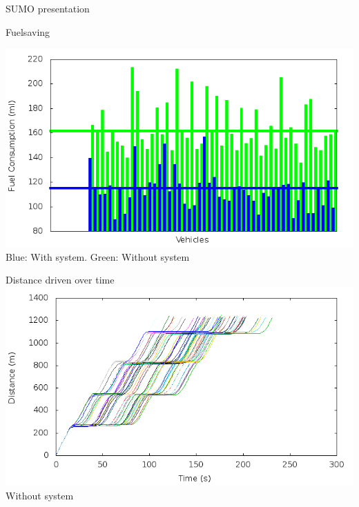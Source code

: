 \begin{frame}{SUMO presentation}
\end{frame}


\begin{frame}{Fuelsaving}

	\includegraphics[width=1\textwidth]{images/tp0/fuelRoute.png}\\
	Blue: With system. Green: Without system

\end{frame}

\begin{frame}{Distance driven over time}
	\includegraphics[width=1\textwidth]{images/tp0/distance0.png}\\
	Without system
\end{frame}

